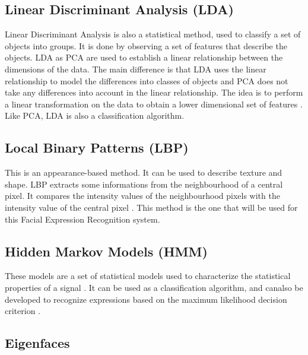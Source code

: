 \subsection{Linear Discriminant Analysis (LDA)}

\vspace{\baselineskip}
\noindent Linear Discriminant Analysis is also a statistical method, used to classify a set of objects into groups. It is done by observing a set of features that describe the objects. LDA as PCA are used to establish a linear relationship between the dimensions of the data. The main difference is that LDA uses the linear relationship to model the differences into classes of objects and PCA does not take any differences into account in the linear relationship. The idea is to perform a linear transformation on the data to obtain a lower dimensional set of features \cite{GAN08}. Like PCA, LDA is also a classification algorithm.
\newline

\subsection{Local Binary Patterns (LBP)}

\vspace{\baselineskip}
\noindent This is an appearance-based method. It can be used to describe texture and shape. LBP extracts some informations from the neighbourhood of a central pixel. It compares the intensity values of the neighbourhood pixels with the intensity value of the central pixel  \cite{GAN08}. This method is the one that will be used for this Facial Expression Recognition system.
\newline

\subsection{Hidden Markov Models (HMM)}

\vspace{\baselineskip}
\noindent These models are a set of statistical models used to characterize the statistical properties of a signal \cite{RAB93}. It can be used as a classification algorithm, and canalso be  developed to recognize expressions based on the maximum likelihood decision criterion \cite{LIE98}.
\newline

\subsection{Eigenfaces}

